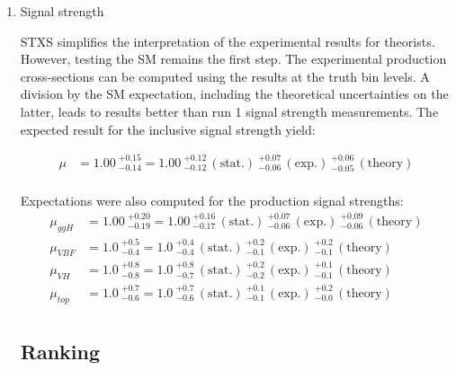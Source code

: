 \begin{enumerate}

\item Signal strength
\label{sec:orgc349fef}

STXS simplifies the interpretation of the experimental results for theorists.
However, testing the SM remains the first step.
The experimental production cross-sections can be computed using the results at the truth bin levels.
A division by the SM expectation, including the theoretical uncertainties on the latter, leads to results better than run 1 signal strength measurements.
The expected result for the inclusive signal strength yield:

\begin{align*}
\mu &= 1.00\ ^{+0.15}_{-0.14} = 1.00\ ^{+0.12}_{-0.12}\,\mathrm{(stat.)}\ ^{+0.07}_{-0.06}\,\mathrm{(exp.)}\ ^{+0.06}_{-0.05}\,\mathrm{(theory)}\\
\end{align*}

Expectations were also computed for the production signal strengths:
\begin{align*}
\mu_{ggH} &= 1.00\ ^{+0.20}_{-0.19} = 1.00\ ^{+0.16}_{-0.17}\,\mathrm{(stat.)}\ ^{+0.07}_{-0.06}\,\mathrm{(exp.)}\ ^{+0.09}_{-0.06}\,\mathrm{(theory)}\\
\mu_{VBF} &= 1.0\ ^{+0.5}_{-0.4} = 1.0\ ^{+0.4}_{-0.4}\,\mathrm{(stat.)}\ ^{+0.2}_{-0.1}\,\mathrm{(exp.)}\ ^{+0.2}_{-0.1}\,\mathrm{(theory)}\\
\mu_{VH} &= 1.0\ ^{+0.8}_{-0.8} = 1.0\ ^{+0.8}_{-0.7}\,\mathrm{(stat.)}\ ^{+0.2}_{-0.2}\,\mathrm{(exp.)}\ ^{+0.1}_{-0.1}\,\mathrm{(theory)}\\
\mu_{top} &= 1.0\ ^{+0.7}_{-0.6} = 1.0\ ^{+0.7}_{-0.6}\,\mathrm{(stat.)}\ ^{+0.1}_{-0.1}\,\mathrm{(exp.)}\ ^{+0.2}_{-0.0}\,\mathrm{(theory)}\\
\end{align*}


\subsection{Ranking}
\label{sec:orge5a0462}


\end{enumerate}
